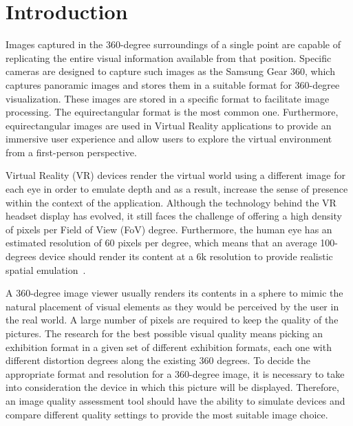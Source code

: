 \documentclass[10pt,conference,pdftex]{IEEEtran}
\begin{document}

\IEEEpeerreviewmaketitle

\section{Introduction} \label{sec:introduction}
Images captured in the 360-degree surroundings of a single point are capable of replicating the entire visual information available from that position. Specific cameras are designed to capture such images as the Samsung Gear 360\degree, which captures panoramic images and stores them in a suitable format for 360-degree visualization. These images are stored in a specific format to facilitate image processing. The equirectangular format is the most common one. Furthermore, equirectangular images are used in Virtual Reality applications to provide an immersive user experience and allow users to explore the virtual environment from a first-person perspective. \par

Virtual Reality (VR) devices render the virtual world using a different image for each eye in order to emulate depth and as a result, increase the sense of presence within the context of the application. Although the technology behind the VR headset display has evolved, it still faces the challenge of offering a high density of pixels per Field of View (FoV) degree. Furthermore, the human eye has an estimated resolution of 60 pixels per degree, which means that an average 100-degrees device should render its content at a 6k resolution to provide realistic spatial emulation~\cite{va1965visual}. \par

A 360-degree image viewer usually renders its contents in a sphere to mimic the natural placement of visual elements as they would be perceived by the user in the real world. A large number of pixels are required to keep the quality of the pictures. The research for the best possible visual quality means picking an exhibition format in a given set of different exhibition formats, each one with different distortion degrees along the existing 360 degrees. To decide the appropriate format and resolution for a 360-degree image, it is necessary to take into consideration the device in which this picture will be displayed.
Therefore, an image quality assessment tool should have the ability to simulate devices and compare different quality settings to provide the most suitable image choice.\par
\end{document}

